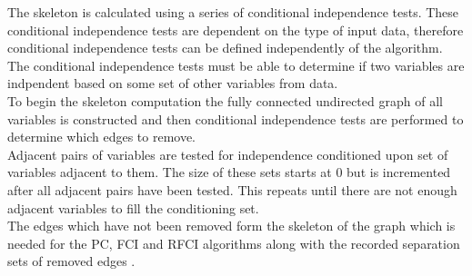 \documentclass{article}
\begin{document}
The skeleton is calculated using a series of conditional independence tests. These conditional independence tests are dependent on the type of input data, therefore conditional independence tests can be defined independently of the algorithm. The conditional independence tests must be able to determine if two variables are indpendent based on some set of other variables from data.
\\

To begin the skeleton computation the fully connected undirected graph of all variables is constructed and then conditional independence tests are performed to determine which edges to remove.
\\

Adjacent pairs of variables are tested for independence conditioned upon set of variables adjacent to them. The size of these sets starts at 0 but is incremented after all adjacent pairs have been tested. This repeats until there are not enough adjacent variables to fill the conditioning set.\\

The edges which have not been removed form the skeleton of the graph which is needed for the PC, FCI and RFCI algorithms along with the recorded separation sets of removed edges \cite{colombo2012learning, spirtes1991algorithm}.
\\
\end{document}
